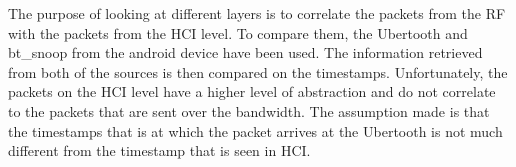 The purpose of looking at different layers is to correlate the packets from the RF with the packets from the HCI level. To compare them, the Ubertooth and bt\_snoop from the android device have been used. The information retrieved from both of the sources is then compared on the timestamps. Unfortunately, the packets on the HCI level have a higher level of abstraction and do not correlate to the packets that are sent over the bandwidth. The assumption made is that the timestamps that is at which the packet arrives at the Ubertooth is not much different from the timestamp that is seen in HCI.
